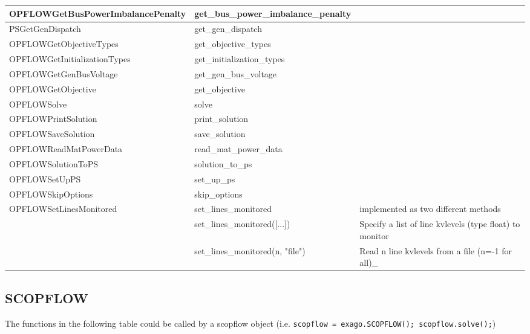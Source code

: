 {\begin{longtable}{|>{\ttfamily}p{}|>{\ttfamily}p{}|p{}|}
    \hline
    OPFLOWGetBusPowerImbalancePenalty & get\_bus\_power\_imbalance\_penalty & ~\\
    \hline
    PSGetGenDispatch & get\_gen\_dispatch & ~\\
    \hline
    OPFLOWGetObjectiveTypes & get\_objective\_types & ~\\
    \hline
    OPFLOWGetInitializationTypes & get\_initialization\_types & ~\\
    \hline
    OPFLOWGetGenBusVoltage & get\_gen\_bus\_voltage & ~\\
    \hline
    OPFLOWGetObjective & get\_objective & ~\\
    \hline
    OPFLOWSolve & solve & ~\\
    \hline
    OPFLOWPrintSolution & print\_solution & ~\\
    \hline
    OPFLOWSaveSolution & save\_solution & ~\\
    \hline
    OPFLOWReadMatPowerData & read\_mat\_power\_data & ~\\
    \hline
    OPFLOWSolutionToPS & solution\_to\_ps & ~\\
    \hline
    OPFLOWSetUpPS & set\_up\_ps & ~\\
    \hline
    OPFLOWSkipOptions & skip\_options & ~\\
    \hline
    OPFLOWSetLinesMonitored & set\_lines\_monitored & implemented as two different methods ~\\
    \hline
    & set\_lines\_monitored([...]) & Specify a list of line kvlevels (type float) to monitor ~\\
    \hline
    & set\_lines\_monitored(n, "file") & Read n line kvlevels from a file (n=-1 for all)\_  ~\\
    \hline
\end{longtable}
}

\subsection{SCOPFLOW}  

The functions in the following table could be called by a scopflow object (i.e. \texttt{scopflow = exago.SCOPFLOW(); scopflow.solve();})

